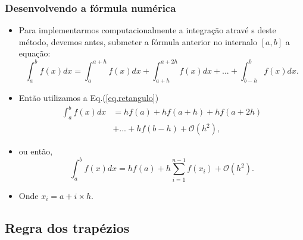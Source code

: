 \documentclass[xcolor=table]{beamer}
\newenvironment{stepitemize}{\begin{itemize}[<+->]}{\end{itemize} }
\begin{document}
\begin{frame}%

\frametitle{Desenvolvendo a f\'{o}rmula num\'{e}rica}

\begin{stepitemize}
\item Para implementarmos computacionalmente a integra\c{c}\~{a}o atrav\'{e}%
s deste m\'{e}todo, devemos antes, submeter a f\'{o}rmula anterior no
internalo $[a,b]$ a equa\c{c}\~{a}o:%
\[
\int_{a}^{b}f\left( x\right) dx=\int_{a}^{a+h}f\left( x\right)
dx+\int_{a+h}^{a+2h}f\left( x\right) dx+...+\int_{b-h}^{b}f\left( x\right)
dx.
\]

\item Ent\~{a}o utilizamos a Eq.(\ref{eq.retangulo})%
\begin{eqnarray*}
	\int_{a}^{b}f\left( x\right) dx&=hf\left( a\right) +hf\left( a+h\right)
	+hf\left( a+2h\right) \\
	&+...+hf\left( b-h\right) + \mathcal{O}\left( h^{2}\right) ,
\end{eqnarray*}
 

\item ou ent\~{a}o,%
\[
\int_{a}^{b}f\left( x\right) dx=hf(a) + h\sum_{i=1}^{n-1}f\left( x_{i}\right) + \mathcal{O}\left( h^{2}\right) . 
\]

\item Onde $x_{i}=a + i\times h$.
\end{stepitemize}

\transboxout%
\end{frame}%

\subsection{Regra dos trap\'{e}zios}
\end{document}

